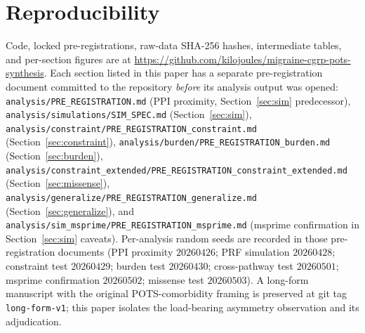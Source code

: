 \documentclass[11pt]{article}
\begin{document}
\section{Reproducibility}

Code, locked pre-registrations, raw-data SHA-256 hashes, intermediate tables, and per-section figures are at \url{https://github.com/kilojoules/migraine-cgrp-pots-synthesis}. Each section listed in this paper has a separate pre-registration document committed to the repository \emph{before} its analysis output was opened: \texttt{analysis/PRE\_REGISTRATION.md} (PPI proximity, Section~\ref{sec:sim} predecessor), \texttt{analysis/simulations/SIM\_SPEC.md} (Section~\ref{sec:sim}), \texttt{analysis/constraint/PRE\_REGISTRATION\_constraint.md} (Section~\ref{sec:constraint}), \texttt{analysis/burden/PRE\_REGISTRATION\_burden.md} (Section~\ref{sec:burden}), \texttt{analysis/constraint\_extended/PRE\_REGISTRATION\_constraint\_extended.md} (Section~\ref{sec:missense}), \texttt{analysis/generalize/PRE\_REGISTRATION\_generalize.md} (Section~\ref{sec:generalize}), and \texttt{analysis/sim\_msprime/PRE\_REGISTRATION\_msprime.md} (msprime confirmation in Section~\ref{sec:sim} caveats). Per-analysis random seeds are recorded in those pre-registration documents (PPI proximity $20260426$; PRF simulation $20260428$; constraint test $20260429$; burden test $20260430$; cross-pathway test $20260501$; msprime confirmation $20260502$; missense test $20260503$). A long-form manuscript with the original POTS-comorbidity framing is preserved at git tag \texttt{long-form-v1}; this paper isolates the load-bearing asymmetry observation and its adjudication.

\printbibliography
\end{document}
